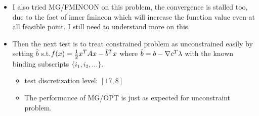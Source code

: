 \documentclass[10pt]{article}
\begin{document}
\begin{itemize}
\item I also tried MG/FMINCON on this problem, the convergence is stalled too, due to the fact of inner fmincon which will increase the function value even at all feasible point. I still need to understand more on this.

\item Then the next test is to treat constrained problem as unconstrained easily by setting $\hat{b}$ s.t.$f(x)=\frac{1}{2}  x^T Ax-\hat{b}^T x$ where $\hat{b}=b-\nabla c^T \lambda$  with the known binding subscripts $\{i_{1},i_{2},\dots\}$. 
\begin{itemize}
\item test discretization level: $[17,8]$
\item The performance of MG/OPT is just as expected for unconstraint problem.
\end{itemize}

\end{itemize}
\end{document}
